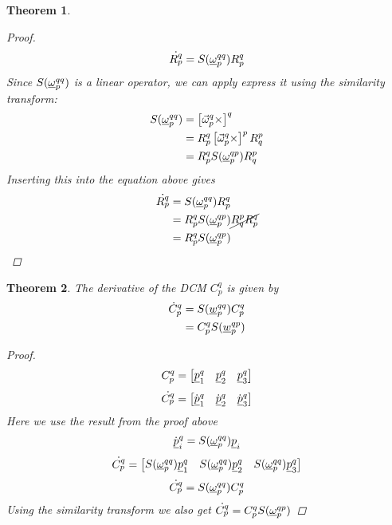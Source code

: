 \documentclass{article}
\newtheorem{theorem}{Theorem}
\begin{document}
\begin{theorem}
\begin{proof}
        $$\dot{R_p^q} = S(\underline{\omega}_p^{qq})R_p^q$$
        Since $S(\underline{\omega}_p^{qq})$ is a linear operator, we can apply express it using the similarity transform:
        \begin{align*}
            S(\underline{\omega}_p^{qq}) &= \left[\vec{\omega}_p^q\times\right]^q\\
            &= R_p^q\left[\vec{\omega}_p^q\times\right]^pR_q^p \\
            &= R_p^qS(\underline{\omega}_p^{qp})R_q^p
        \end{align*}
        Inserting this into the equation above gives
        \begin{align*}
            \dot{R_p^q} &= S(\underline{\omega}_p^{qq})R_p^q \\
            &= R_p^qS(\underline{\omega}_p^{qp})\cancel{R_q^pR_p^q} \\
            &= R_p^qS(\underline{\omega}_p^{qp})
        \end{align*}
    \end{proof}
\end{theorem}

\begin{theorem}
    The derivative of the DCM $C_p^q$ is given by
    \begin{align*}
        \dot{C}_p^q &= S(\underline{w}_p^{qq})C_p^q \\
        &= C_p^qS(\underline{w}_p^{qp})
    \end{align*}
    \begin{proof}
        $$C_p^q = \begin{bmatrix} {\underline{p}}_1^q & {\underline{p}}_2^q & {\underline{p}}_3^q\end{bmatrix}$$
        $$\dot{C_p^q} = \begin{bmatrix} {\dot{\underline{p}}}_1^q & \dot{\underline{p}}_2^q & \dot{\underline{p}}_3^q\end{bmatrix}$$
        Here we use the result from the proof above
        $$\dot{\underline{p}}_i^q = S(\underline{\omega}_p^{qq})\underline{p}_i$$
        $$\dot{C_p^q} = \begin{bmatrix} S(\underline{\omega}_p^{qq}){\underline{p}}_1^q & S(\underline{\omega}_p^{qq})\underline{p}_2^q & S(\underline{\omega}_p^{qq})\underline{p}_3^q\end{bmatrix}$$
        $$\dot{C_p^q} = S(\underline{\omega}_p^{qq})C_p^q$$
        Using the similarity transform we also get $\dot{C_p^q} = C_p^qS(\underline{\omega}_p^{qp})$
    \end{proof}
\end{theorem}
\end{document}
